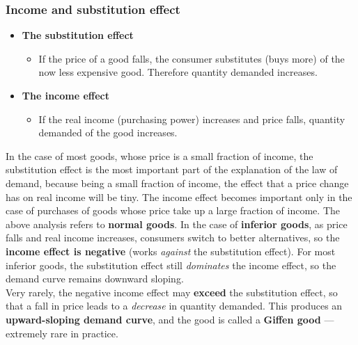 \documentclass[a4paper,12pt]{article}
\newcommand{\needbold}[1]{\textcolor{red!70!black}{\textbf{#1}}}
\begin{document}
\subsubsection*{Income and substitution effect}
\begin{itemize}
  \item \needbold{The substitution effect}
  \begin{itemize}
    \item If the price of a good falls, the consumer substitutes (buys more) of the now less expensive good. Therefore quantity demanded increases. 
  \end{itemize}
  \item \needbold{The income effect}
  \begin{itemize}
    \item If the real income (purchasing power) increases and price falls, quantity demanded of the good increases.
  \end{itemize}
\end{itemize}
In the case of most goods, whose price is a small fraction of income, the substitution effect is the most important part of the explanation of the law of demand, because being a small fraction of income, the effect that a price change has on real income will be tiny. The income effect becomes important only in the case of purchases of goods whose price take up a large fraction of income.
The above analysis refers to \textbf{normal goods}. In the case of \textbf{inferior goods}, as price falls and real income increases, consumers switch to better alternatives, so the \textbf{income effect is negative} (works \textit{against} the substitution effect). For most inferior goods, the substitution effect still \textit{dominates} the income effect, so the demand curve remains downward sloping.\\
Very rarely, the negative income effect may \textbf{exceed} the substitution effect, so that a fall in price leads to a \textit{decrease} in quantity demanded. This produces an \textbf{upward-sloping demand curve}, and the good is called a \textbf{Giffen good} --- extremely rare in practice.
\begin{center}
\end{center}
\end{document}
